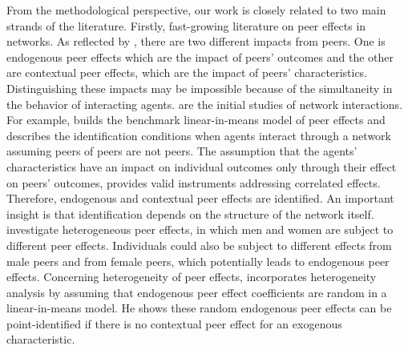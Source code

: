From the methodological perspective, our work is closely related to two main strands of the literature. Firstly, fast-growing literature on peer effects in networks. As reflected by \cite{10.2307/2298123}, there are two different impacts from peers. One is endogenous peer effects which are the impact of peers’ outcomes and the other are contextual peer effects, which are the impact of peers’ characteristics. Distinguishing these impacts may be impossible because of the simultaneity in the behavior of interacting agents. \cite{bramoulle2009identification,de2010identification,lin2010identifying,laschever2005doughboys} are the initial studies of network interactions. For example, \cite{bramoulle2009identification} builds the benchmark linear-in-means model of peer effects and describes the identification conditions when agents interact through a network assuming peers of peers are not peers. The assumption that the agents’ characteristics have an impact on individual outcomes only through their effect on peers’ outcomes, provides valid instruments addressing correlated effects. Therefore, endogenous and contextual peer effects are identified. An important insight is that identification depends on the structure of the network itself. \cite{bramoulle2013comment, arduini2014identification, arduini2020treatment, beugnot2019gender} investigate heterogeneous peer effects, in which men and women are subject to different peer effects. Individuals could also be subject to different effects from male peers and from female peers, which potentially leads to endogenous peer effects. Concerning heterogeneity of peer effects, \cite{masten2018random} incorporates heterogeneity analysis by assuming that endogenous peer effect coefficients are random in a linear-in-means model. He shows these random endogenous peer effects can be point-identified if there is no contextual peer effect for an exogenous characteristic.

